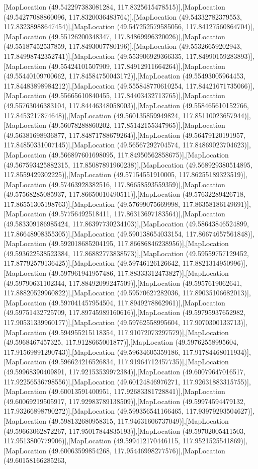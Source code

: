 [MapLocation (49.542297383081284, 117.8325615478515)],[MapLocation (49.54277088860096, 117.8320036483764)],[MapLocation (49.54332782379553, 117.83238988647454)],[MapLocation (49.547252579585056, 117.84127560864704)],[MapLocation (49.55126200348347, 117.84869996320026)],[MapLocation (49.55187452537859, 117.8493007780196)],[MapLocation (49.55326659202943, 117.84998742352741)],[MapLocation (49.553906929366335, 117.84990159283893)],[MapLocation (49.55424101507909, 117.84912911664264)],[MapLocation (49.55440109700662, 117.84584750043172)],[MapLocation (49.55493005964453, 117.84483898984212)],[MapLocation (49.555848770610254, 117.84421671735066)],[MapLocation (49.55665610840455, 117.84403432713765)],[MapLocation (49.55763046383104, 117.84446348058003)],[MapLocation (49.558465610152766, 117.8453217874648)],[MapLocation (49.560135859949824, 117.85110023657944)],[MapLocation (49.56078288860202, 117.85142155347965)],[MapLocation (49.56381698936877, 117.84871788679264)],[MapLocation (49.56479120191957, 117.84850331007145)],[MapLocation (49.56567292704574, 117.84869023704623)],[MapLocation (49.566897601698095, 117.84950562858675)],[MapLocation (49.567593425882315, 117.85087891960238)],[MapLocation (49.568929380514895, 117.8559429302225)],[MapLocation (49.57154551910005, 117.86255189323519)],[MapLocation (49.57463928382516, 117.86658593559359)],[MapLocation (49.57568285085937, 117.86650010490511)],[MapLocation (49.57632289426718, 117.86551305198763)],[MapLocation (49.57699075669998, 117.86358186149691)],[MapLocation (49.57756492518411, 117.86313697183564)],[MapLocation (49.583309186985424, 117.86397730234103)],[MapLocation (49.58643846524899, 117.86648908355305)],[MapLocation (49.590138654033154, 117.86674657561848)],[MapLocation (49.592018685204195, 117.86686846238956)],[MapLocation (49.593622538523384, 117.86882773838573)],[MapLocation (49.59559757129452, 117.87792579136425)],[MapLocation (49.59746126126642, 117.8821314950996)],[MapLocation (49.597961941957486, 117.88333312473827)],[MapLocation (49.59790631102344, 117.88492099247509)],[MapLocation (49.5957619062641, 117.88820529960822)],[MapLocation (49.59570627282036, 117.89035106682013)],[MapLocation (49.597041457954504, 117.8949278862961)],[MapLocation (49.59751432725709, 117.89745989160616)],[MapLocation (49.59795937652982, 117.90531339960177)],[MapLocation (49.59762558995604, 117.9070300133713)],[MapLocation (49.594955215118354, 117.91072073297579)],[MapLocation (49.5968467457325, 117.9128665001877)],[MapLocation (49.59762558995604, 117.91569891290743)],[MapLocation (49.59634605359186, 117.91784468011934)],[MapLocation (49.596624216526834, 117.91964712457735)],[MapLocation (49.59968390409891, 117.92153539972384)],[MapLocation (49.60079647016517, 117.92256536798556)],[MapLocation (49.60124846976271, 117.92631883315755)],[MapLocation (49.60013591400951, 117.92683381728841)],[MapLocation (49.60069219505917, 117.92983789138509)],[MapLocation (49.59974594479132, 117.93266898790272)],[MapLocation (49.599356541166465, 117.93979293504627)],[MapLocation (49.598132680958315, 117.94631606737049)],[MapLocation (49.59663062872267, 117.95017844835193)],[MapLocation (49.59702005411503, 117.9513800779906)],[MapLocation (49.599412170446115, 117.9521525541869)],[MapLocation (49.60063599854268, 117.95446998277576)],[MapLocation (49.60158166285263, 